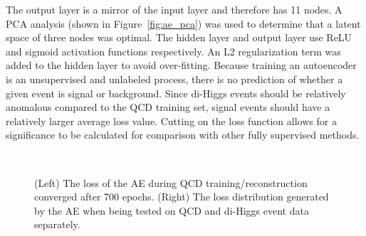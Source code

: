 The output layer is a mirror of the input layer and therefore has 11 nodes. A PCA analysis (shown in Figure~\ref{fig:ae_pca}) was used to determine that a latent space of three nodes was optimal. The hidden layer and output layer use ReLU and sigmoid activation functions respectively. An L2 regularization term was added to the hidden layer to avoid over-fitting. %
Because training an autoencoder is an unsupervised and unlabeled process, there is no prediction of whether a given event is signal or background. Since di-Higgs events should be relatively anomalous compared to the QCD training set, signal events should have a relatively larger average loss value. Cutting on the loss function allows for a significance to be calculated for comparison with other fully supervised methods.

\begin{figure}[!h] 
  \begin{center}
    \\
    \caption{(Left) The loss of the AE during QCD training/reconstruction converged after 700 epochs. (Right) The loss distribution generated by the AE when being tested on QCD and di-Higgs event data separately.}    
  \label{fig:ae_trainPredLoss}
\end{center}
\end{figure}

